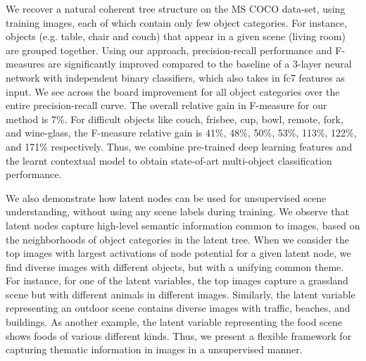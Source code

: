 \documentclass{article}
\begin{document}



We  recover a natural coherent tree structure on the MS COCO data-set, using training images, each of which contain only few object categories. For instance, objects (e.g. table, chair and couch) that appear in a given scene (living room) are grouped together.
Using our approach, precision-recall performance and F-measures are significantly improved compared to the baseline of a 3-layer neural network with independent binary classifiers, which also takes in fc7 features as input. We see across the board improvement for all object categories  over the entire precision-recall curve. The
overall   relative gain in F-measure for our method is 7\%.   For difficult objects like couch, frisbee, cup, bowl, remote, fork, and wine-glass,  the F-measure relative gain is 41\%,  48\%, 50\%, 53\%,  113\%,  122\%, and 171\% respectively.   Thus, we combine   pre-trained deep learning features and the learnt contextual model to obtain state-of-art multi-object classification performance.




We also demonstrate how   latent nodes can be used for unsupervised scene understanding, without using any scene labels during training. We observe that latent nodes capture high-level semantic information   common to images, based on the   neighborhoods of object categories in the latent tree.  When we consider the top  images with largest activations of node potential for a given latent node, we find diverse images with different objects, but with a unifying  common theme. For instance, for one of the latent variables, the top images capture  a grassland scene but with  different animals in different images.  Similarly,  the latent variable representing an outdoor scene contains diverse images with traffic, beaches, and buildings. As another example, the latent variable representing the food scene shows foods of various different kinds. Thus, we present a flexible framework for capturing thematic information in images in a unsupervised manner.
\end{document}
